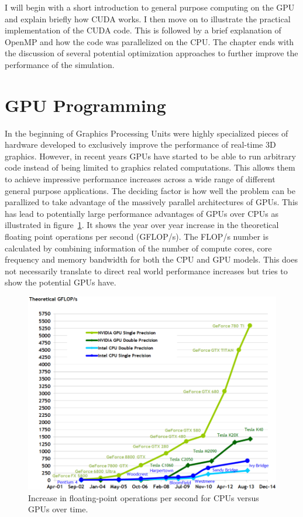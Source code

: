 \documentclass[a4paper,11pt]{kth-mag}
\begin{document}
I will begin with a short introduction to general purpose computing on the GPU and explain briefly how CUDA works. I then move on to illustrate the practical implementation of the CUDA code. This is followed by a brief explanation of OpenMP and how the code was parallelized on the CPU. The chapter ends with the discussion of several potential optimization approaches to further improve the performance of the simulation.

\section{GPU Programming}
In the beginning of Graphics Processing Units were highly specialized pieces of hardware developed to exclusively improve the performance of real-time 3D graphics. However, in recent years GPUs have started to be able to run arbitrary code instead of being limited to graphics related computations. This allows them to achieve impressive performance increases across a wide range of different general purpose applications. The deciding factor is how well the problem can be parallized to take advantage of the massively parallel architectures of GPUs. This has lead to potentially large performance advantages of GPUs over CPUs as illustrated in figure~\ref{fig:gpu_performance}. It shows the year over year increase in the theoretical floating point operations per second (GFLOP/s). The FLOP/s number is calculated by combining information of the number of compute cores, core frequency and memory bandwidth for both the CPU and GPU models. This does not necessarily translate to direct real world performance increases but tries to show the potential GPUs have.

\begin{figure}
  \centering
  \includegraphics[width=\textwidth]{img/gpu_performance.pdf}
  \caption{Increase in floating-point operations per second for CPUs versus GPUs over time.}
  \label{fig:gpu_performance}
\end{figure}
\end{document}
